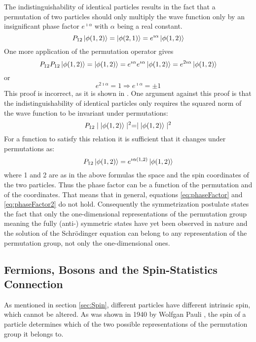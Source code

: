 The indistinguishability of identical particles results in the fact that a permutation of two particles should only multiply the wave function only by an insignificant phase factor $e^{\imath\alpha}$ with $\alpha$ being a real constant.
\begin{equation}
 P_{12}\ket{\phi(1,2)} = \ket{\phi(2,1)} = e^{\imath\alpha}\ket{\phi(1,2)}
\end{equation} 
One more application of the permutation operator gives
\begin{equation}
\label{eq:phaseFactor}
 P_{12}P_{12}\ket{\phi(1,2)} =  \ket{\phi(1,2)} = e^{\imath\alpha}e^{\imath\alpha}\ket{\phi(1,2)} = e^{2\imath\alpha}\ket{\phi(1,2)}
\end{equation} 
or
\begin{equation}
\label{eq:phaseFactor2}
 e^{2\imath\alpha} = 1 \Rightarrow e^{\imath\alpha} = \pm 1
\end{equation} 
This proof is incorrect, as it is shown in \cite{Kaplan2013}. One argument against this proof is that the indistinguishability of identical particles only requires the squared norm of the wave function to be invariant under permutations:
\begin{equation}
 P_{12}\mid\ket{\phi(1,2)}\mid^{2} = \mid\ket{\phi(1,2)}\mid^{2}
\end{equation} 
For a function to satisfy this relation it is sufficient that it changes under permutations as:
\begin{equation}
 P_{12}\ket{\phi(1,2)} = e^{\imath\alpha(1,2)}\ket{\phi(1,2)}
\end{equation} 
where 1 and 2 are as in the above formulas the space and the spin coordinates of the two particles. Thus the phase factor can be a function of the permutation and of the coordinates. That means that in general, equations \ref{eq:phaseFactor} and \ref{eq:phaseFactor2} do not hold. Consequently the symmetrization postulate states the fact that only the one-dimensional representations of the permutation group meaning the fully (anti-) symmetric states have yet been observed in nature and the solution of the Schrödinger equation can belong to any representation of the permutation group, not only the one-dimensional ones.

\subsection{Fermions, Bosons and the Spin-Statistics Connection}

As mentioned in section \ref{sec:Spin}, different particles have different intrinsic spin, which cannot be altered. As was shown in 1940 by Wolfgan Pauli \cite{Pauli1940}, the spin of a particle determines which of the two possible representations of the permutation group it belongs to. 

